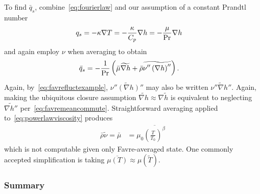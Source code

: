 To find $\bar{q}_s$, combine~\eqref{eq:fourierlaw} and our assumption of a
constant Prandtl number
\begin{align}
  q_{s} &= - \kappa \nabla{} T
     = - \frac{\kappa}{C_p} \nabla{}h
     = - \frac{\mu}{\mbox{Pr}_{}} \nabla{}h
\end{align}
and again employ $\nu$ when averaging to obtain
\begin{align}
  \bar{q}_s
&= - \frac{1}{\mbox{Pr}_{}}\left(
                \bar{\mu}\widetilde{\nabla{}h}
              + \bar{\rho} \widetilde{\nu''\left(\nabla{}h\right)''}
            \right)
.
\end{align}
Again, by~\eqref{eq:favrefluctexample},
$\widetilde{\nu''\left(\nabla{}h\right)''}$ may also be written
$\widetilde{\nu''\nabla{}h''}$.  Again, making the ubiquitous closure
assumption $\widetilde{\nabla{}h}\approx\nabla\tilde{h}$ is equivalent to
neglecting $\widetilde{\nabla{}h''}$ per~\eqref{eq:favremeancommute}.
Straightforward averaging applied to~\eqref{eq:powerlawviscosity} produces
\begin{align}
   \bar{\rho}\tilde{\nu}
 = \bar{\mu}
&= \mu_0 \overline{\left(\frac{T}{T_0}\right)^\beta}
\end{align}
which is not computable given only Favre-averaged state.  One commonly accepted
simplification is taking $\overline{\mu\left(T\right)} \approx
\mu\left(\tilde{T}\right)$.

\subsubsection{Summary}


